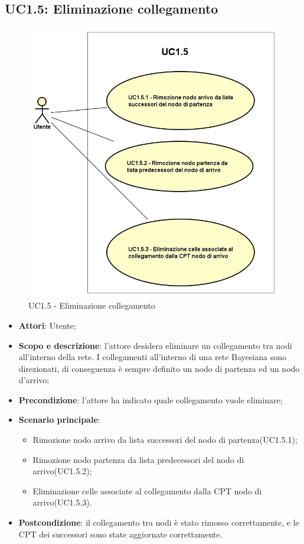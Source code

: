 \subsection{UC1.5: Eliminazione collegamento} 
\hypertarget{UC1.5}{} 
\begin{figure} [H]
	\centering
	\includegraphics[scale=0.45]{Img/UC1-5} 
	\caption{UC1.5 - Eliminazione collegamento} \label{} 
\end{figure} 
\begin{itemize} 
	\item{\textbf{Attori}: Utente;} 
	\item{\textbf{Scopo e descrizione}: l'attore desidera eliminare un collegamento tra nodi all'interno della rete. I collegamenti all'interno di una rete Bayesiana sono direzionati, di conseguenza è sempre definito un nodo di partenza ed un nodo d'arrivo;} 
	\item{\textbf{Precondizione}: l'attore ha indicato quale collegamento vuole eliminare;} 
	\item{\textbf{Scenario principale}: } 
	\begin{itemize} 
		\item{Rimozione nodo arrivo da lista successori del nodo di partenza(UC1.5.1);} 
		\item{Rimozione nodo partenza da lista predecessori del nodo di arrivo(UC1.5.2);} 
		\item{Eliminazione celle associate al collegamento dalla CPT nodo di arrivo(UC1.5.3).} 
	\end{itemize} 
	\item{\textbf{Postcondizione}: il collegamento tra nodi è stato rimosso correttamente, e le CPT dei successori sono state aggiornate correttamente.} 
\end{itemize} 
